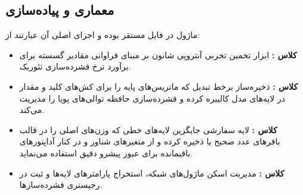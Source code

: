 \subsection{معماری و پیاده‌سازی}
ماژول در فایل  مستقر بوده و اجزای اصلی آن عبارتند از:
\begin{itemize}
    \item \textbf{کلاس :} ابزار تخمین تجربی آنتروپی شانون بر مبنای فراوانی مقادیر گسسته برای برآورد نرخ فشرده‌سازی تئوریک.
    \item \textbf{کلاس :} ذخیره‌ساز برخط تبدیل  که ماتریس‌های پایه  را برای کش‌های کلید و مقدار در لایه‌های مدل کالیبره کرده و فشرده‌سازی حافظه توالی‌های پویا را مدیریت می‌کند.
    \item \textbf{کلاس :} لایه سفارشی جایگزین لایه‌های خطی که وزن‌های اصلی را در قالب بافرهای عدد صحیح  یا  ذخیره کرده و از متغیرهای شناور  و  در کنار آداپتورهای باقیمانده  برای عبور پیشرو دقیق استفاده می‌نماید.
    \item \textbf{کلاس :} مدیریت اسکن ماژول‌های شبکه، استخراج پارامترهای لایه‌ها و ثبت در رجیستری فشرده‌سازها.
\end{itemize}
